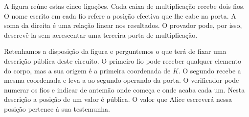 A figura reúne estas cinco ligações. Cada caixa de multiplicação
recebe dois fios. O nome escrito em cada fio refere a posição
efectiva que lhe cabe na porta. A soma da direita é uma relação
linear nos resultados. O provador pode, por isso, descrevê-la
sem acrescentar uma terceira porta de multiplicação.
\begin{center}
\end{center}

Retenhamos a disposição da figura e perguntemos o que terá de fixar
uma descrição pública deste circuito. O primeiro fio pode receber
qualquer elemento do corpo, mas a sua origem é a primeira coordenada
de \(K\). O segundo recebe a mesma coordenada e leva-a ao segundo operando da porta. O verificador
pode numerar os fios e indicar de antemão onde começa e onde acaba
cada um. Nesta descrição a posição de um valor é pública. O valor
que Alice escreverá nessa posição pertence à sua testemunha.

